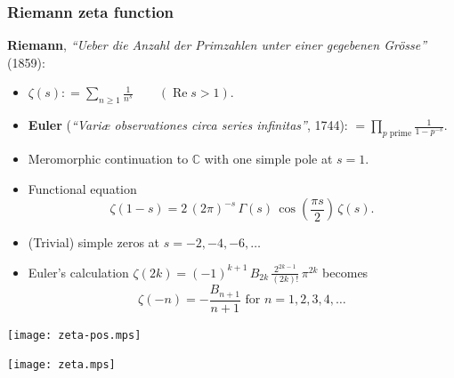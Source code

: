 \documentclass[handout]{beamer}
\newcommand{\personality}[1]{{\bf #1}}
\newcommand{\CC}{\mathbb{C}}
\newcommand{\dfn}{\mathrel{\mathop:}=}
\begin{document}
\begin{frame}
  \frametitle{Riemann zeta function}

  \personality{Riemann}, \emph{``Ueber die Anzahl der Primzahlen unter einer
    gegebenen Gr\"{o}sse''} (1859):

  \begin{itemize}
  \item<2-> $\zeta (s) \dfn \sum_{n \ge 1} \frac{1}{n^s} \quad\quad (\operatorname{Re} s > 1)$.

  \item<3-> \personality{Euler}
    (\emph{``Vari\ae{} observationes circa series infinitas''}, 1744):
    $= \prod_{p\text{ prime}} \frac{1}{1 - p^{-s}}$.

  \item<4-> Meromorphic continuation to $\CC$ with one simple pole at $s = 1$.

  \item<5-> Functional equation
    $$\zeta (1-s) = 2\,(2\pi)^{-s}\,\Gamma (s) \, \cos \left(\frac{\pi s}{2}\right)\,\zeta(s).$$
  \end{itemize}

  \begin{itemize}
  \item<6-> (Trivial) simple zeros at $s = -2, -4, -6, \ldots$

  \item<7-> Euler's calculation
    $\zeta (2k) = (-1)^{k+1}\,B_{2k} \, \frac{2^{2k-1}}{(2k)!}\,\pi^{2k}$
    becomes
    $$\zeta (-n) = -\frac{B_{n+1}}{n+1} \text{ for } n = 1,2,3,4,\ldots$$
  \end{itemize}
\end{frame}


\begin{frame}
  \begin{center}
    \texttt{[image: zeta-pos.mps]}
  \end{center}
\end{frame}


\begin{frame}
  \begin{center}
    \texttt{[image: zeta.mps]}
  \end{center}
\end{frame}
\end{document}
